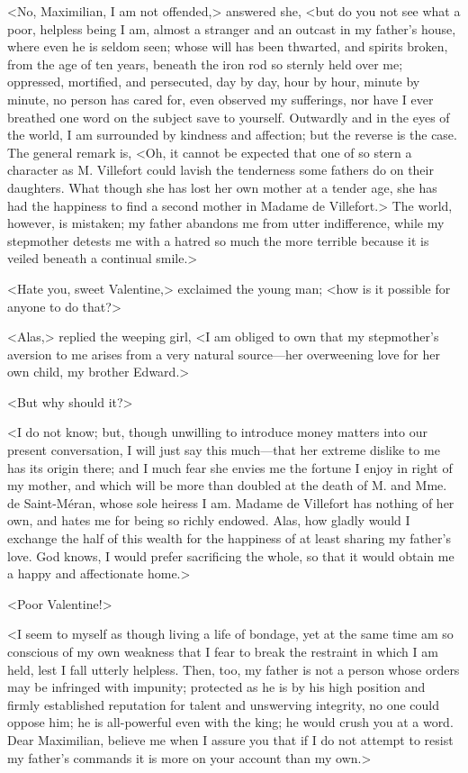  <No, Maximilian, I am not offended,> answered she, <but do you not see what a poor, helpless being I am, almost a stranger and an outcast in my father's house, where even he is seldom seen; whose will has been thwarted, and spirits broken, from the age of ten years, beneath the iron rod so sternly held over me; oppressed, mortified, and persecuted, day by day, hour by hour, minute by minute, no person has cared for, even observed my sufferings, nor have I ever breathed one word on the subject save to yourself. Outwardly and in the eyes of the world, I am surrounded by kindness and affection; but the reverse is the case. The general remark is, <Oh, it cannot be expected that one of so stern a character as M. Villefort could lavish the tenderness some fathers do on their daughters. What though she has lost her own mother at a tender age, she has had the happiness to find a second mother in Madame de Villefort.> The world, however, is mistaken; my father abandons me from utter indifference, while my stepmother detests me with a hatred so much the more terrible because it is veiled beneath a continual smile.> 

 <Hate you, sweet Valentine,> exclaimed the young man; <how is it possible for anyone to do that?> 

 <Alas,> replied the weeping girl, <I am obliged to own that my stepmother's aversion to me arises from a very natural source—her overweening love for her own child, my brother Edward.> 

 <But why should it?> 

 <I do not know; but, though unwilling to introduce money matters into our present conversation, I will just say this much—that her extreme dislike to me has its origin there; and I much fear she envies me the fortune I enjoy in right of my mother, and which will be more than doubled at the death of M. and Mme. de Saint-Méran, whose sole heiress I am. Madame de Villefort has nothing of her own, and hates me for being so richly endowed. Alas, how gladly would I exchange the half of this wealth for the happiness of at least sharing my father's love. God knows, I would prefer sacrificing the whole, so that it would obtain me a happy and affectionate home.> 

 <Poor Valentine!> 

 <I seem to myself as though living a life of bondage, yet at the same time am so conscious of my own weakness that I fear to break the restraint in which I am held, lest I fall utterly helpless. Then, too, my father is not a person whose orders may be infringed with impunity; protected as he is by his high position and firmly established reputation for talent and unswerving integrity, no one could oppose him; he is all-powerful even with the king; he would crush you at a word. Dear Maximilian, believe me when I assure you that if I do not attempt to resist my father's commands it is more on your account than my own.> 

